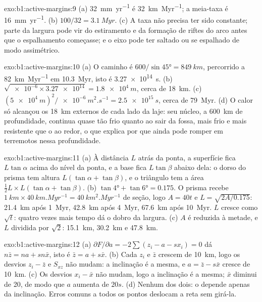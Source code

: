 \begin{solution}{exo:b1:active-margins:9}
(a) \qty{32}{mm.yr^{-1}} é \qty{32}{km.Myr^{-1}}; a meia-taxa é
\qty{16}{mm.yr^{-1}}. (b) $100/32 = \qty{3.1}{Myr}$. (c) A taxa não precisa ter sido constante; parte da largura
pode vir do estiramento e da formação de riftes do arco antes que o espalhamento começasse; e o eixo pode ter saltado ou se espalhado de modo assimétrico.
\end{solution}

\begin{solution}{exo:b1:active-margins:10}
(a) O caminho é $600/\sin\ang{45} = \qty{849}{km}$, percorrido a
\qty{82}{km.Myr^{-1}} em \qty{10.3}{Myr}, isto é \qty{3.27e14}{s}.
(b) $\sqrt{\num{e-6}\times\num{3.27e14}} = \qty{1.8e4}{m}$, cerca de
\qty{18}{km}. (c) $(\qty{5e4}{m})^2/\qty{e-6}{m^2.s^{-1}} = \qty{2.5e15}{s}$,
cerca de \qty{79}{Myr}. (d) O calor só alcançou os \qty{18}{km} externos de cada lado da laje: seu núcleo, a \qty{600}{km} de profundidade, continua quase tão frio quanto ao sair da fossa, mais frio e mais resistente que o  ao redor, o que explica por que ainda pode romper em terremotos nessa profundidade.
\end{solution}

\begin{solution}{exo:b1:active-margins:11}
(a) À distância $L$ atrás da ponta, a superfície fica $L\tan\alpha$ acima do nível da ponta, e a base fica $L\tan\beta$ abaixo dela: o dorso do prisma tem altura $L(\tan\alpha + \tan\beta)$, e o triângulo tem a área
$\frac12 L\times L(\tan\alpha + \tan\beta)$. (b) $\tan\ang{4} + \tan\ang{6} =
0.175$. O prisma recebe $\qty{1}{km}\times\qty{40}{km.Myr^{-1}} =
\qty{40}{km^2.Myr^{-1}}$ de seção, logo $A = 40t$ e
$L = \sqrt{2A/0.175}$: \qty{21.4}{km} após \qty{1}{Myr}, \qty{42.8}{km}
após \qty{4}{Myr}, \qty{67.6}{km} após \qty{10}{Myr}. $L$ cresce como
$\sqrt t$: quatro vezes mais tempo dá o dobro da largura. (c) $A$ é reduzida à metade, e $L$
dividida por $\sqrt2$: \qty{15.1}{km}, \qty{30.2}{km} e \qty{47.8}{km}.
\end{solution}

\begin{solution}{exo:b1:active-margins:12}
(a) $\partial F/\partial a = -2\sum(z_i - a - s x_i) = 0$ dá
$n\bar z = na + sn\bar x$, isto é $\bar z = a + s\bar x$. (b) Cada $z_i$ e
$\bar z$ crescem de \qty{10}{km}, logo os desvios $z_i - \bar z$ e $S_{xz}$
não mudam: a inclinação é a mesma, e $a = \bar z - s\bar x$ cresce de
\qty{10}{km}. (c) Os desvios $x_i - \bar x$ não mudam, logo a inclinação é a
mesma; $\bar x$ diminui de 20, de modo que $a$ aumenta de $20s$. (d) Nenhum dos dois:
o  depende apenas da inclinação. Erros comuns a todos os pontos deslocam a reta sem girá-la.
\end{solution}

